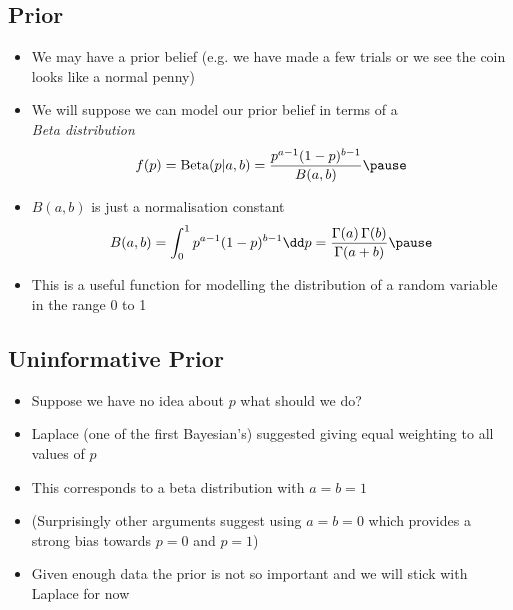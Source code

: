 \begin{slide}
\section[-2]{Prior}

\begin{PauseHighLight}
  \begin{itemize}
  \item We may have a prior belief (e.g. we have made a few trials or
    we see the coin looks like a normal penny)\pause
  \item We will suppose we can model our prior belief in terms of a\\
    \emph{Beta distribution}
    \begin{align*}
      f(p) = \mathrm{Beta}(p|a,b) = \frac{p^{a-1}(1-p)^{b-1}}{B(a,b)}\pause
    \end{align*}
  \item $B(a,b)$ is just a normalisation constant
    \begin{align*}
      B(a,b) = \int_0^1 p^{a-1}(1-p)^{b-1} \dd p =
      \frac{\Gamma(a)\,\Gamma(b)}{\Gamma(a+b)} \pause
    \end{align*}
  \item This is a useful function for modelling the distribution of a
    random variable in the range 0 to 1\pause
  \end{itemize}
\end{PauseHighLight}

\end{slide}


\begin{slide}
\section{Uninformative Prior}

\begin{PauseHighLight}
  \begin{itemize}
  \item Suppose we have no idea about $p$ what should we do?\pause
  \item Laplace (one of the first Bayesian's) suggested giving equal
    weighting to all values of $p$\pause
  \item This corresponds to a beta distribution with $a=b=1$\pause
  \item (Surprisingly other arguments suggest using $a=b=0$ which
    provides a strong bias towards $p=0$ and $p=1$)\pause
  \item Given enough data the prior is not so important and we will
    stick with Laplace for now\pause
  \end{itemize}
\end{PauseHighLight}

\end{slide}


